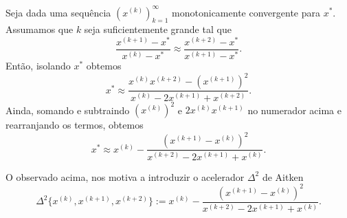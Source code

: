 Seja dada uma sequência $(x^{(k)})_{k=1}^\infty$ monotonicamente convergente para $x^*$. Assumamos que $k$ seja suficientemente grande tal que
\begin{equation}
  \frac{x^{(k+1)}-x^*}{x^{(k)}-x^*} \approx \frac{x^{(k+2)}-x^*}{x^{(k+1)}-x^*}.
\end{equation}
Então, isolando $x^*$ obtemos
\begin{equation}
  x^* \approx \frac{x^{(k)}x^{(k+2)}-(x^{(k+1)})^2}{x^{(k)}-2x^{(k+1)}+x^{(k+2)}}.
\end{equation}
Ainda, somando e subtraindo $(x^{(k)})^2$ e $2x^{(k)}x^{(k+1)}$ no numerador acima e rearranjando os termos, obtemos
\begin{equation}
  x^* \approx x^{(k)} - \frac{(x^{(k+1)}-x^{(k)})^2}{x^{(k+2)}-2x^{(k+1)}+x^{(k)}}.
\end{equation}

O observado acima, nos motiva a introduzir o acelerador $\Delta^2$ de Aitken
\begin{equation}
  \Delta^2\{x^{(k)},x^{(k+1)},x^{(k+2)}\} := x^{(k)} - \frac{(x^{(k+1)}-x^{(k)})^2}{x^{(k+2)}-2x^{(k+1)}+x^{(k)}}.
\end{equation}


